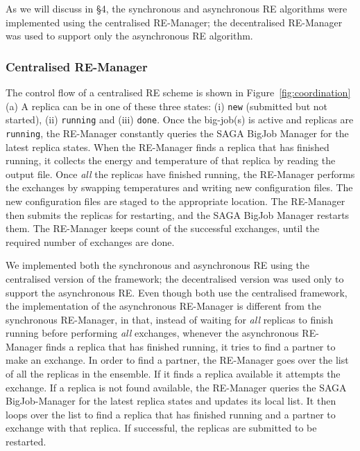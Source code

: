 \documentclass{rspublic}
\newcommand{\jhanote}[1]{ {\textcolor{red} { ***shantenu: #1 }}}
\newcommand{\jhanote}[1]{}
\begin{document}


As we will discuss in \S4, the synchronous and asynchronous RE
algorithms were implemented using the centralised RE-Manager; the
decentralised RE-Manager was used to support only the asynchronous RE
algorithm.


\subsubsection{Centralised RE-Manager}



The control flow of a centralised RE scheme is shown in
Figure~\ref{fig:coordination}(a) %
A replica can be in one of these three states:
(i) \texttt{new} (submitted but not started), (ii) \texttt{running}
and (iii) \texttt{done}.  Once the big-job(s) is active and replicas
are \texttt{running}, the RE-Manager constantly queries the SAGA
BigJob Manager for the latest replica states.  When the RE-Manager
finds a replica that has finished running, it collects the energy and
temperature of that replica by reading the output file. Once
\emph{all} the replicas have finished running, the RE-Manager performs
the exchanges by swapping temperatures and writing new configuration
files. The new configuration files are staged to the appropriate
location. The RE-Manager then submits the replicas for restarting, and
the SAGA BigJob Manager restarts them. The RE-Manager keeps count of
the successful exchanges, until the required number of exchanges are
done.

We implemented both the synchronous and asynchronous RE using the
centralised version of the framework; the decentralised version was
used only to support the asynchronous RE.  Even though both use the
centralised framework, the implementation of the asynchronous
RE-Manager is different from the synchronous RE-Manager, in that,
instead of waiting for \emph{all} replicas to finish running before
performing \emph{all} exchanges, whenever the asynchronous RE-Manager
finds a replica that has finished running, it tries to find a partner
to make an exchange. In order to find a partner, the RE-Manager goes
over the list of all the replicas in the ensemble. If it finds a
replica available it attempts the exchange. If a replica is not found
available, the RE-Manager queries the SAGA BigJob-Manager for the
latest replica states and updates its local list. It then loops over
the list to find a replica that has finished running and a partner to
exchange with that replica.  If successful, the replicas are submitted
to be restarted.
\end{document}
